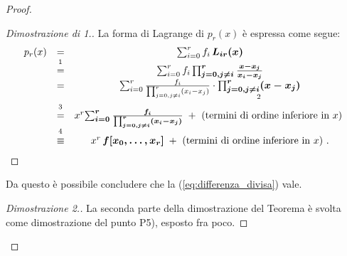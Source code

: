 \begin{proof}
\begin{proof}[Dimostrazione di 1.]
        La forma di Lagrange di $p_r(x)$ è espressa come segue:
        \begin{equation*}
            \begin{matrix}
                p_r(x) &=& \sum_{i=0}^r f_i\, \boldsymbol{L_{ir}(x)} \\
                &\overset{\footnotemark}{=}& \sum_{i=0}^r f_i\,\boldsymbol{\prod_{j=0, j\neq i}^r\frac{x-x_j}{x_i-x_j}} \\
                &=&\sum_{i=0}^r \frac{f_i}{\prod_{j=0, j\neq i}^r(x_i-x_j)}\cdot \underset{\footnotemark}{\boldsymbol{\prod_{j=0, j\neq i}^r(x-x_j)}} \\
                &\overset{\footnotemark}{=}& x^r\boldsymbol{\sum_{i=0}^r\frac{f_i}{\prod_{j=0, j\neq i}^r(x_i-x_j)}}\;+ \text{ (termini di ordine inferiore in $x$) }\\
                &\overset{\footnotemark}{\equiv}& x^r\, \boldsymbol{f[x_0,\hdots, x_r]}\; + \text{ (termini di ordine inferiore in $x$) }.
            \end{matrix}
        \end{equation*}
    \end{proof}
    \addtocounter{footnote}{-3}
    
    
    
    Da questo è possibile concludere che la (\ref{eq:differenza_divisa}) vale.

    \begin{proof}[Dimostrazione 2.]
        La seconda parte della dimostrazione del Teorema è svolta come dimostrazione del punto P5), esposto fra poco.
    \end{proof}
\end{proof}

